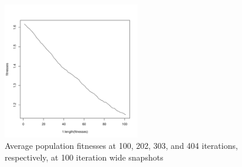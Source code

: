 \documentclass[12pt]{article}
\begin{document}
\begin{figure}[!h]
\begin{center}
		\includegraphics[width=60mm]{images/ackley.ss/avg_1111.pdf}
               	\caption{Average population fitnesses at 100, 202, 303, and 404 iterations, respectively, at 100 iteration wide snapshots}
                \label{ackley_ss_avg_pop_fit}
        \end{center}
\end{figure}


\pagebreak
\end{document}
